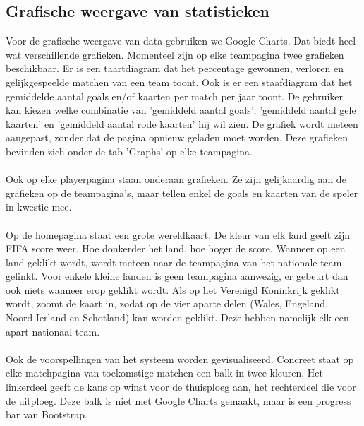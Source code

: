 \documentclass[11pt, a4paper]{article}
\begin{document}
\subsection{Grafische weergave van statistieken}
Voor de grafische weergave van data gebruiken we Google Charts. Dat biedt heel wat verschillende grafieken. Momenteel zijn op elke teampagina twee grafieken beschikbaar. Er is een taartdiagram dat het percentage gewonnen, verloren en gelijkgespeelde matchen van een team toont. Ook is er een staafdiagram dat het gemiddelde aantal goals en/of kaarten per match per jaar toont. De gebruiker kan kiezen welke combinatie van 'gemiddeld aantal goals', 'gemiddeld aantal gele kaarten' en 'gemiddeld aantal rode kaarten' hij wil zien. De grafiek wordt meteen aangepast, zonder dat de pagina opnieuw geladen moet worden. Deze grafieken bevinden zich onder de tab 'Graphs' op elke teampagina. \\ \\
Ook op elke playerpagina staan onderaan grafieken. Ze zijn gelijkaardig aan de grafieken op de teampagina's, maar tellen enkel de goals en kaarten van de speler in kwestie mee. \\ \\
Op de homepagina staat een grote wereldkaart. De kleur van elk land geeft zijn FIFA score weer. Hoe donkerder het land, hoe hoger de score. Wanneer op een land geklikt wordt, wordt meteen naar de teampagina van het nationale team gelinkt. Voor enkele kleine landen is geen teampagina aanwezig, er gebeurt dan ook niets wanneer erop geklikt wordt. Als op het Verenigd Koninkrijk geklikt wordt, zoomt de kaart in, zodat op de vier aparte delen (Wales, Engeland, Noord-Ierland en Schotland) kan worden geklikt. Deze hebben namelijk elk een apart nationaal team. \\ \\
Ook de voorspellingen van het systeem worden gevisualiseerd. Concreet staat op elke matchpagina van toekomstige matchen een balk in twee kleuren. Het linkerdeel geeft de kans op winst voor de thuisploeg aan, het rechterdeel die voor de uitploeg. Deze balk is niet met Google Charts gemaakt, maar is een progress bar van Bootstrap.
\end{document}
